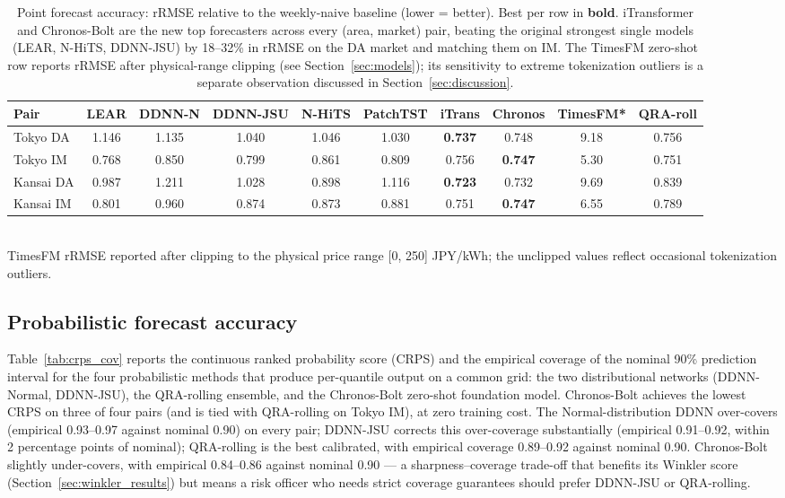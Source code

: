 \documentclass[review,3p,times,authoryear]{elsarticle}
\begin{document}
\begin{table}[t]
\centering\small
\caption{Point forecast accuracy: rRMSE relative to the weekly-naive baseline (lower = better). Best per row in \textbf{bold}. iTransformer and Chronos-Bolt are the new top forecasters across every (area, market) pair, beating the original strongest single models (LEAR, N-HiTS, DDNN-JSU) by 18--32\% in rRMSE on the DA market and matching them on IM. The TimesFM zero-shot row reports rRMSE after physical-range clipping (see Section~\ref{sec:models}); its sensitivity to extreme tokenization outliers is a separate observation discussed in Section~\ref{sec:discussion}.}\label{tab:point_rrmse}
\begin{tabular}{lccccccccc}
\toprule
Pair & LEAR & DDNN-N & DDNN-JSU & N-HiTS & PatchTST & iTrans & Chronos & TimesFM* & QRA-roll \\
\midrule
Tokyo DA  & 1.146 & 1.135 & 1.040 & 1.046 & 1.030 & \textbf{0.737} & 0.748 & 9.18 & 0.756 \\
Tokyo IM  & 0.768 & 0.850 & 0.799 & 0.861 & 0.809 & 0.756 & \textbf{0.747} & 5.30 & 0.751 \\
Kansai DA & 0.987 & 1.211 & 1.028 & 0.898 & 1.116 & \textbf{0.723} & 0.732 & 9.69 & 0.839 \\
Kansai IM & 0.801 & 0.960 & 0.874 & 0.873 & 0.881 & 0.751 & \textbf{0.747} & 6.55 & 0.789 \\
\bottomrule
\end{tabular}
\\\smallskip
\footnotesize *TimesFM rRMSE reported after clipping to the physical price range [0, 250] JPY/kWh; the unclipped values reflect occasional tokenization outliers.
\end{table}

\subsection{Probabilistic forecast accuracy}\label{sec:prob_results}

Table~\ref{tab:crps_cov} reports the continuous ranked probability score (CRPS) and the empirical coverage of the nominal 90\% prediction interval for the four probabilistic methods that produce per-quantile output on a common grid: the two distributional networks (DDNN-Normal, DDNN-JSU), the QRA-rolling ensemble, and the Chronos-Bolt zero-shot foundation model. Chronos-Bolt achieves the lowest CRPS on three of four pairs (and is tied with QRA-rolling on Tokyo IM), at zero training cost. The Normal-distribution DDNN over-covers (empirical 0.93--0.97 against nominal 0.90) on every pair; DDNN-JSU corrects this over-coverage substantially (empirical 0.91--0.92, within 2 percentage points of nominal); QRA-rolling is the best calibrated, with empirical coverage 0.89--0.92 against nominal 0.90. Chronos-Bolt slightly under-covers, with empirical 0.84--0.86 against nominal 0.90 --- a sharpness--coverage trade-off that benefits its Winkler score (Section~\ref{sec:winkler_results}) but means a risk officer who needs strict coverage guarantees should prefer DDNN-JSU or QRA-rolling.
\end{document}
